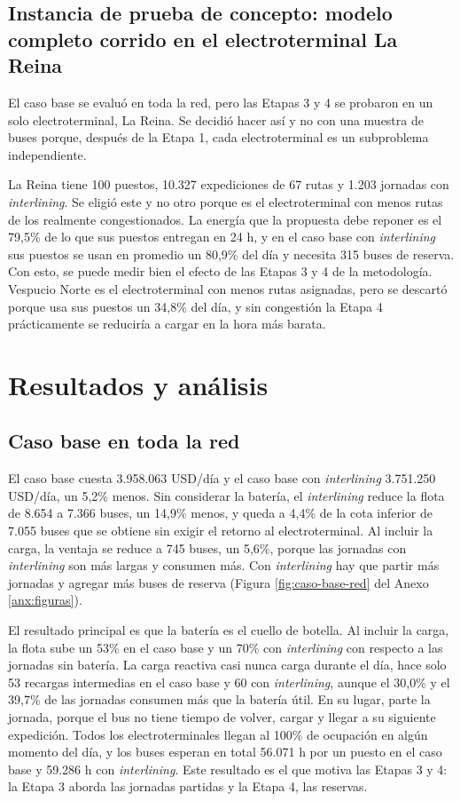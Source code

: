 \subsection{Instancia de prueba de concepto: modelo completo corrido en el electroterminal La Reina}

El caso base se evaluó en toda la red, pero las Etapas 3 y 4 se probaron en un solo electroterminal, La Reina. Se decidió hacer así y no con una muestra de buses porque, después de la Etapa 1, cada electroterminal es un subproblema independiente.

La Reina tiene 100 puestos, 10.327 expediciones de 67 rutas y 1.203 jornadas con \textit{interlining}. Se eligió este y no otro porque es el electroterminal con menos rutas de los realmente congestionados. La energía que la propuesta debe reponer es el 79,5\% de lo que sus puestos entregan en 24 h, y en el caso base con \textit{interlining} sus puestos se usan en promedio un 80,9\% del día y necesita 315 buses de reserva. Con esto, se puede medir bien el efecto de las Etapas 3 y 4 de la metodología. Vespucio Norte es el electroterminal con menos rutas asignadas, pero se descartó porque usa sus puestos un 34,8\% del día, y sin congestión la Etapa 4 prácticamente se reduciría a cargar en la hora más barata.

\section{Resultados y análisis}

\subsection{Caso base en toda la red}

El caso base cuesta 3.958.063 USD/día y el caso base con \textit{interlining} 3.751.250 USD/día, un 5,2\% menos. Sin considerar la batería, el \textit{interlining} reduce la flota de 8.654 a 7.366 buses, un 14,9\% menos, y queda a 4,4\% de la cota inferior de 7.055 buses que se obtiene sin exigir el retorno al electroterminal. Al incluir la carga, la ventaja se reduce a 745 buses, un 5,6\%, porque las jornadas con \textit{interlining} son más largas y consumen más. Con \textit{interlining} hay que partir más jornadas y agregar más buses de reserva (Figura \ref{fig:caso-base-red} del Anexo \ref{anx:figuras}).

El resultado principal es que la batería es el cuello de botella. Al incluir la carga, la flota sube un 53\% en el caso base y un 70\% con \textit{interlining} con respecto a las jornadas sin batería. La carga reactiva casi nunca carga durante el día, hace solo 53 recargas intermedias en el caso base y 60 con \textit{interlining}, aunque el 30,0\% y el 39,7\% de las jornadas consumen más que la batería útil. En su lugar, parte la jornada, porque el bus no tiene tiempo de volver, cargar y llegar a su siguiente expedición. Todos los electroterminales llegan al 100\% de ocupación en algún momento del día, y los buses esperan en total 56.071 h por un puesto en el caso base y 59.286 h con \textit{interlining}. Este resultado es el que motiva las Etapas 3 y 4: la Etapa 3 aborda las jornadas partidas y la Etapa 4, las reservas.

